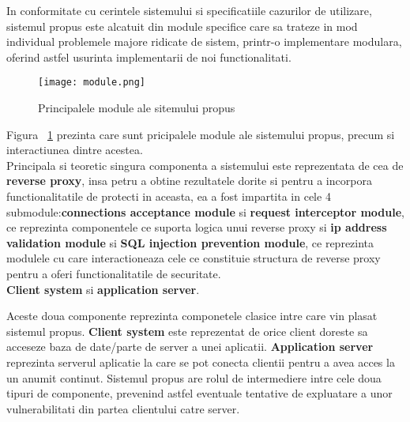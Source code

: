 In conformitate cu cerintele sistemului si specificatiile cazurilor de utilizare, sistemul propus este alcatuit din module specifice care sa trateze in mod individual problemele majore ridicate de sistem, printr-o implementare modulara, oferind astfel usurinta implementarii de noi functionalitati.

\begin{figure}[h]
	\centering
	\texttt{[image: module.png]}
	\caption{Principalele module ale sitemului propus}
	\label{fig:module}
\end{figure}
Figura ~\ref{fig:module} prezinta care sunt pricipalele module ale sistemului propus, precum si interactiunea dintre acestea. \\

Principala si teoretic singura componenta a sistemului este reprezentata de cea de \textbf{reverse proxy}, insa petru a obtine rezultatele dorite si pentru a incorpora functionalitatile de protecti in aceasta, ea a fost impartita in cele 4 submodule:\textbf{connections acceptance module} si \textbf{request interceptor module}, ce reprezinta componentele ce suporta logica unui reverse proxy si \textbf{ip address validation module} si \textbf{SQL injection prevention module}, ce reprezinta modulele cu care interactioneaza cele ce constituie structura de reverse proxy pentru a oferi functionalitatile de securitate.\\




\textbf{Client system} si  \textbf{application server}.

Aceste doua componente reprezinta componetele clasice intre care vin plasat sistemul propus. \textbf{Client system} este reprezentat de orice client doreste sa acceseze baza de date/parte de server a unei aplicatii. \textbf{Application server} reprezinta serverul aplicatie la care se pot conecta clientii pentru a avea acces la un anumit continut. Sistemul propus are rolul de intermediere intre cele doua tipuri de componente, prevenind astfel eventuale tentative de expluatare a unor vulnerabilitati din partea clientului catre server.




